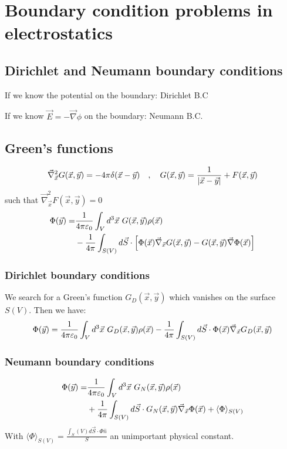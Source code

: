 \section{Boundary condition problems in electrostatics}

\subsection{Dirichlet and Neumann boundary conditions}

If we know the potential on the boundary: Dirichlet B.C

If we know $\vec{E} = - \vec{\nabla} \phi$ on the boundary: Neumann B.C.

\subsection{Green's functions}

\begin{align*}
    \vec{\nabla}_{\vec{x}}^2 G(\vec{x},\vec{y}) = -4 \pi \delta(\vec{x} - \vec{y})
    \hspace{10pt} , \hspace{10pt}
    G(\vec{x},\vec{y}) = \frac{1}{\left\vert \vec{x} - \vec{y} \right\vert} + F(\vec{x},\vec{y})
\end{align*}
such that $\vec{\nabla}_{\vec{x}}^2 F(\vec{x},\vec{y}) = 0$
\begin{align*}
    \Phi(\vec{y})
    = &\frac{1}{4 \pi \epsilonnull} \int_V d^3 \vec{x} \ G(\vec{x},\vec{y}) \rho(\vec{x})
        \\
        &- \frac{1}{4 \pi} \int_{S(V)} d \vec{S} \cdot
        \eckigeklammer{\Phi(\vec{x}) \vec{\nabla}_{\vec{x}} G(\vec{x},\vec{y})
        - G(\vec{x},\vec{y}) \vec{\nabla} \Phi(\vec{x})}
\end{align*}

\subsubsection{Dirichlet boundary conditions}
We search for a Green's function $G_D (\vec{x},\vec{y})$ which vanishes on
the surface $S(V)$. Then we have:
\begin{align*}
    \Phi(\vec{y}) = \frac{1}{4 \pi \varepsilon_0} \int_V d^3 \vec{x} \
        G_D (\vec{x},\vec{y}) \rho(\vec{x})
        - \frac{1}{4 \pi} \int_{S(V)} d \vec{S} \cdot \Phi(\vec{x})
        \vec{\nabla}_{\vec{x}} G_D (\vec{x},\vec{y})
\end{align*}

\subsubsection{Neumann boundary conditions}
\begin{align*}
    \Phi(\vec{y}) =
    &\frac{1}{4 \pi \varepsilon_0} \int_V d^3 \vec{x} \ G_N (\vec{x},\vec{y}) \rho(\vec{x})
    \\
    &+ \frac{1}{4 \pi} \int_{S(V)} d \vec{S} \cdot G_N (\vec{x},\vec{y}) \vec{\nabla}_{\vec{x}} \Phi(\vec{x})
    + \langle \Phi \rangle_{S(V)}
\end{align*}
With $\langle \Phi \rangle_{S(V)} = \frac{\int_S(V) d \vec{S} \cdot \Phi \hat{n}}{S}$
an unimportant physical constant.

